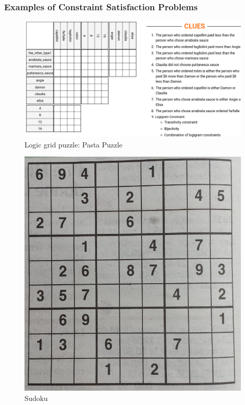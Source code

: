 \documentclass{beamer}
\begin{document}
	\begin{frame}
	\frametitle{Examples of Constraint Satisfaction Problems}
		\begin{minipage}[t]{0.6\textwidth}
			\begin{figure}[h]
				\includegraphics[width=\textwidth]{logic_puzzle.png}
				\caption{Logic grid puzzle: Pasta Puzzle}
			\end{figure}
		\end{minipage}
	\hfill
			\begin{minipage}[t]{0.29\textwidth}
			\begin{figure}[h]
				\includegraphics[width=\textwidth]{sudoku.jpg}
				\caption{Sudoku}
			\end{figure}
		\end{minipage}
	\end{frame}
\end{document}
